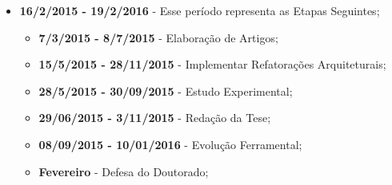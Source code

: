 \begin{itemize}
\item \textbf{16/2/2015 - 19/2/2016} - Esse período representa as Etapas Seguintes;

\begin{itemize}
	\item \textbf{7/3/2015 - 8/7/2015} - Elaboração de Artigos;
	\item \textbf{15/5/2015 - 28/11/2015} - Implementar Refatorações Arquiteturais;
	\item \textbf{28/5/2015 - 30/09/2015} - Estudo Experimental;
	\item \textbf{29/06/2015 - 3/11/2015} - Redação da Tese;
	\item \textbf{08/09/2015 - 10/01/2016} - Evolução Ferramental;
	\item \textbf{Fevereiro} - Defesa do Doutorado;
\end{itemize}

\end{itemize}


